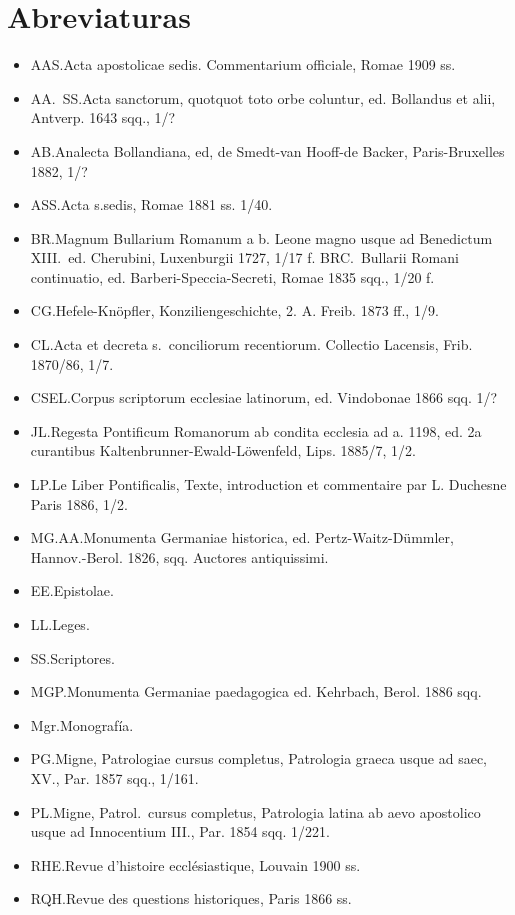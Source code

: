\raggedbottom{} \documentclass[12pt, a4paper]{book}
\begin{document}
\section{Abreviaturas}
\begin{itemize}
  \item AAS.\@ Acta apostolicae sedis. Commentarium officiale, Romae 1909 ss.
  \item AA.\ SS.\@ Acta sanctorum, quotquot toto orbe coluntur, ed. Bollandus et alii, Antverp. 1643 sqq., 1/?
  \item AB.\@ Analecta Bollandiana, ed, de Smedt-van Hooff-de Backer, Paris-Bruxelles 1882, 1/?
  \item ASS.\@ Acta s.\@ sedis, Romae 1881 ss. 1/40.
  \item BR.\@ Magnum Bullarium Romanum a b. Leone magno usque ad Benedictum XIII.\ ed. Cherubini, Luxenburgii 1727, 1/17 f. BRC.\ Bullarii Romani continuatio, ed. Barberi-Speccia-Secreti, Romae 1835 sqq., 1/20 f.
  \item CG.\@ Hefele-Knöpfler, Konziliengeschichte, 2. A. Freib. 1873 ff., 1/9.
  \item CL.\@ Acta et decreta s.\ conciliorum recentiorum. Collectio Lacensis, Frib. 1870/86, 1/7.
  \item CSEL.\@ Corpus scriptorum ecclesiae latinorum, ed. Vindobonae 1866 sqq. 1/?
  \item JL.\@ Regesta Pontificum Romanorum ab condita ecclesia ad a. 1198, ed. 2a curantibus Kaltenbrunner-Ewald-Löwenfeld, Lips. 1885/7, 1/2.
  \item LP.\@ Le Liber Pontificalis, Texte, introduction et commentaire par L. Duchesne Paris 1886, 1/2.
  \item MG.\@ AA.\@ Monumenta Germaniae historica, ed. Pertz-Waitz-Dümmler, Hannov.-Berol. 1826, sqq. Auctores antiquissimi.
  \item EE.\@ Epistolae.
  \item LL.\@ Leges.
  \item SS.\@ Scriptores.
  \item MGP.\@ Monumenta Germaniae paedagogica ed. Kehrbach, Berol. 1886 sqq.
  \item Mgr.\@ Monografía.

  \item PG.\@ Migne, Patrologiae cursus completus, Patrologia graeca usque ad saec, XV., Par. 1857 sqq., 1/161.

  \item PL.\@ Migne, Patrol.\ cursus completus, Patrologia latina ab aevo apostolico usque ad Innocentium III., Par. 1854 sqq. 1/221.
  \item RHE.\@ Revue d'histoire ecclésiastique, Louvain 1900 ss.
  \item RQH.\@ Revue des questions historiques, Paris 1866 ss.
\end{itemize}
\end{document}

